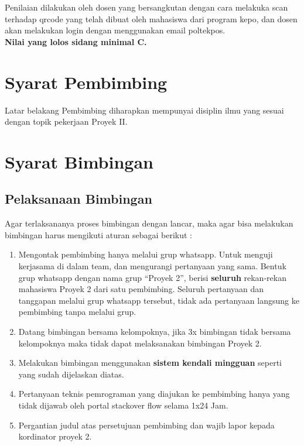  \par Penilaian dilakukan oleh dosen yang bersangkutan dengan cara melakuka scan terhadap qrcode yang telah dibuat oleh mahasiswa dari program kepo, dan dosen akan melakukan login dengan menggunakan email poltekpos.\\ \textbf{Nilai yang lolos sidang minimal C.}
 
\section{Syarat Pembimbing}
Latar	belakang	Pembimbing	diharapkan	mempunyai	disiplin	ilmu	yang	sesuai	dengan	topik	
pekerjaan	Proyek II.

\section{Syarat	Bimbingan}
\subsection{Pelaksanaan Bimbingan}
\par 
Agar	 terlaksananya	 proses	 bimbingan	 dengan	 lancar,	 maka	 agar	 bisa	 melakukan	
bimbingan	harus	mengikuti	aturan	sebagai	berikut	:

\begin{enumerate}
	\item Mengontak	 pembimbing	 hanya	 melalui	 grup	 whatsapp.	 Untuk	 menguji kerjasama	di	dalam	team,	dan	mengurangi	pertanyaan	yang	sama.	Bentuk	grup whatsapp	dengan	nama	grup	“Proyek	2”,	berisi	\textbf{seluruh} rekan-rekan	mahasiswa Proyek	 2	 dari	 satu	 pembimbing. Seluruh pertanyaan dan tanggapan melalui	grup	whatsapp tersebut,	 tidak	ada	 pertanyaan	langsung ke	 pembimbing	 tanpa	
melalui	grup.
	
	\item Datang	 bimbingan	 bersama	 kelompoknya,	 jika	 3x	 bimbingan	 tidak	 bersama kelompoknya	maka	tidak	dapat	melaksanakan	bimbingan	Proyek	2.

	\item Melakukan bimbingan menggunakan \textbf{sistem kendali mingguan}
	seperti yang sudah dijelaskan diatas.
	
	\item Pertanyaan	 teknis	 pemrograman	 yang	 diajukan	 ke	 pembimbing hanya	 yang	tidak	dijawab	oleh	portal stackover	flow	selama	1x24	Jam.
	
	\item Pergantian	 judul	 atas	 persetujuan	 pembimbing	 dan	 wajib	 lapor	 kepada	
kordinator	proyek	2.

\end{enumerate}

